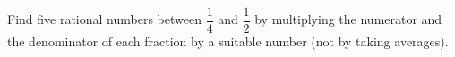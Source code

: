 Find five rational numbers between $\dfrac{1}{4}$ and $\dfrac{1}{2}$ by multiplying the numerator and the denominator of each fraction by a suitable number (not by taking averages).

